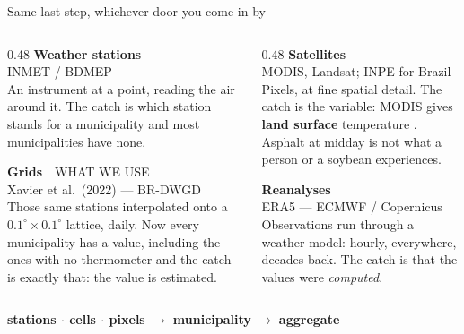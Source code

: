\documentclass[aspectratio=169,10pt]{beamer}
\newcommand{\dtag}[2]{{\ttfamily\scriptsize\color{#1}#2}}
\newcommand{\dsub}[1]{{\scriptsize\color{climgrey}#1}}
\begin{document}
\begin{frame}{Same last step, whichever door you come in by}
  \vspace{-2pt}
  \begin{columns}[T]
    \begin{column}{0.48\textwidth}
      {\bfseries\color{climdeep}Weather stations}\\
      \dsub{INMET / BDMEP}\\[2pt]
      {\footnotesize An instrument at a point, reading the air around it. The
       catch is which station stands for a municipality  and most
       municipalities have none.}

      \vspace{10pt}
      {\bfseries\color{climorange}Grids}\ \ \dtag{climorange}{WHAT WE USE}\\
      \dsub{Xavier et al.\ (2022) --- BR-DWGD}\\[2pt]
      {\footnotesize Those same stations interpolated onto a
       $0.1^\circ \times 0.1^\circ$ lattice, daily. Now every municipality has a
       value, including the ones with no thermometer and the catch is
       exactly that: the value is estimated.}
    \end{column}
    \begin{column}{0.48\textwidth}
      {\bfseries\color{climdeep}Satellites}\\
      \dsub{MODIS, Landsat; INPE for Brazil}\\[2pt]
      {\footnotesize Pixels, at fine spatial detail. The catch is the variable:
       MODIS gives \textbf{land surface} temperature . Asphalt at midday is not what a person or a soybean
       experiences.}

      \vspace{10pt}
      {\bfseries\color{climdeep}Reanalyses}\\
      \dsub{ERA5 --- ECMWF / Copernicus}\\[2pt]
      {\footnotesize Observations run through a weather model: hourly,
       everywhere, decades back. The catch is that the values were
       \emph{computed}.}
    \end{column}
  \end{columns}
  \vspace{8pt}
  \begin{center}
    \textbf{stations $\cdot$ cells $\cdot$ pixels} $\rightarrow$
    \textbf{municipality} $\rightarrow$ \textbf{aggregate}\\[3pt]

  \end{center}
\end{frame}
\end{document}
